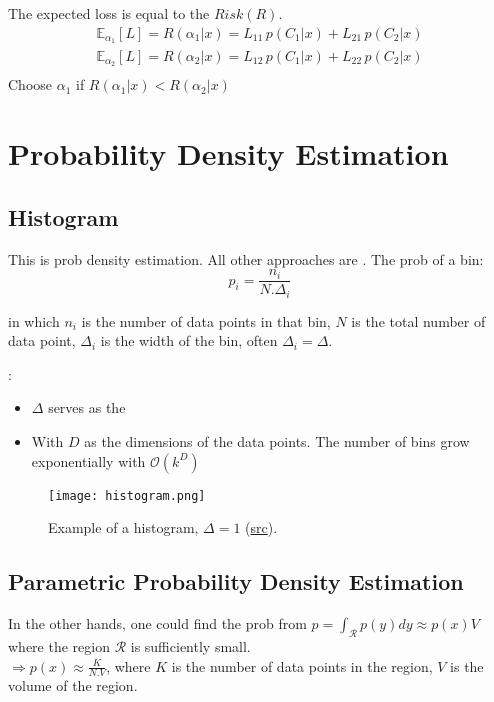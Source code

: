 The expected loss is equal to the $Risk(R)$.
\begin{align*}
	\mathbb{E}_{\alpha_1}[L] = R(\alpha_1|x) = L_{11}\,p(C_1|x) + L_{21}\,p(C_2|x)\\
	\mathbb{E}_{\alpha_2}[L] = R(\alpha_2|x) = L_{12}\,p(C_1|x) + L_{22}\,p(C_2|x)\\
\end{align*}
Choose $\alpha_1$ if $R(\alpha_1|x) < R(\alpha_2|x)$


\section{Probability Density Estimation}
\label{cha:pdf-estimation}

\subsection{Histogram}
This is  \ac{prob} density estimation. All other approaches are . The \ac{prob} of a bin:
\begin{equation}
	p_i = \frac{n_i}{N.\Delta_i}
\end{equation}

in which $n_i$ is the number of data points in that bin, $N$ is the total number of data point, $\Delta_i$ is the width of the bin, often $\Delta_i=\Delta$.

:
\begin{itemize}
	\item $\Delta$ serves as the 
	\item With $D$ as the dimensions of the data points. The number of bins grow exponentially with $\mathcal{O}(k^D)$
\end{itemize}
\begin{figure}[hbt!]
	\centering
	\texttt{[image: histogram.png]}
	\caption{Example of a histogram, $\Delta = 1$ (\href{https://en.wikipedia.org/wiki/Histogram}{src}).}
\end{figure}

\subsection{Parametric Probability Density Estimation}
In the other hands, one could find the \ac{prob} from $\displaystyle p = \int_{\mathcal{R}}p(y)dy \approx p(x)V$ where the region $\mathcal{R}$ is sufficiently small.\\
$\displaystyle \Rightarrow p(x) \approx \frac{K}{N.V}$, where $K$ is the number of data points in the region, $V$ is the volume of the region.

